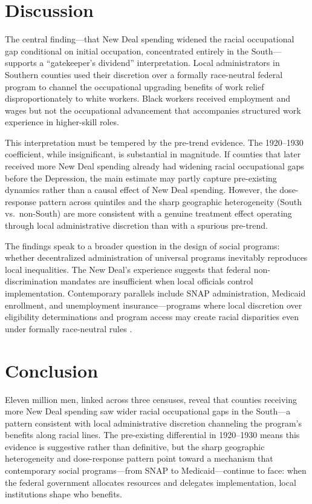 \documentclass[12pt]{article}
\begin{document}
\section{Discussion}

The central finding---that New Deal spending widened the racial occupational gap conditional on initial occupation, concentrated entirely in the South---supports a ``gatekeeper's dividend'' interpretation. Local administrators in Southern counties used their discretion over a formally race-neutral federal program to channel the occupational upgrading benefits of work relief disproportionately to white workers. Black workers received employment and wages but not the occupational advancement that accompanies structured work experience in higher-skill roles.

This interpretation must be tempered by the pre-trend evidence. The 1920--1930 coefficient, while insignificant, is substantial in magnitude. If counties that later received more New Deal spending already had widening racial occupational gaps before the Depression, the main estimate may partly capture pre-existing dynamics rather than a causal effect of New Deal spending. However, the dose-response pattern across quintiles and the sharp geographic heterogeneity (South vs.\ non-South) are more consistent with a genuine treatment effect operating through local administrative discretion than with a spurious pre-trend.

The findings speak to a broader question in the design of social programs: whether decentralized administration of universal programs inevitably reproduces local inequalities. The New Deal's experience suggests that federal non-discrimination mandates are insufficient when local officials control implementation. Contemporary parallels include SNAP administration, Medicaid enrollment, and unemployment insurance---programs where local discretion over eligibility determinations and program access may create racial disparities even under formally race-neutral rules \citep{katznelson2005}.

\section{Conclusion}

Eleven million men, linked across three censuses, reveal that counties receiving more New Deal spending saw wider racial occupational gaps in the South---a pattern consistent with local administrative discretion channeling the program's benefits along racial lines. The pre-existing differential in 1920--1930 means this evidence is suggestive rather than definitive, but the sharp geographic heterogeneity and dose-response pattern point toward a mechanism that contemporary social programs---from SNAP to Medicaid---continue to face: when the federal government allocates resources and delegates implementation, local institutions shape who benefits.
\end{document}
